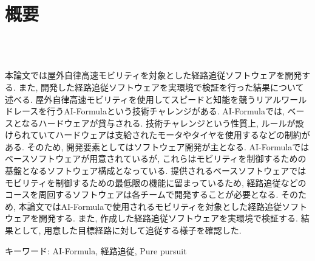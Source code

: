 \chapter*{概要}
\thispagestyle{empty}
%
\begin{center}
  \centering
  \scalebox{1.5}{屋外自律高速モビリティを対象とした}\\
  \scalebox{1.5}{経路追従ソフトウェアの開発}\\
\end{center}
\vspace{1.0zh}
%

%
本論文では屋外自律高速モビリティを対象とした経路追従ソフトウェアを開発する.
また, 開発した経路追従ソフトウェアを実環境で検証を行った結果について述べる.
屋外自律高速モビリティを使用してスピードと知能を競うリアルワールドレースを行うAI-Formulaという技術チャレンジがある.
%
AI-Formulaでは, ベースとなるハードウェアが貸与される.
技術チャレンジという性質上, ルールが設けられていてハードウェアは支給されたモータやタイヤを使用するなどの制約がある.
そのため, 開発要素としてはソフトウェア開発が主となる.
%
AI-Formulaではベースソフトウェアが用意されているが, これらはモビリティを制御するための基盤となるソフトウェア構成となっている.
提供されるベースソフトウェアではモビリティを制御するための最低限の機能に留まっているため, 経路追従などのコースを周回するソフトウェアは各チームで開発することが必要となる.
そのため, 本論文ではAI-Formulaで使用されるモビリティを対象とした経路追従ソフトウェアを開発する.
また, 作成した経路追従ソフトウェアを実環境で検証する.
結果として, 用意した目標経路に対して追従する様子を確認した.

%
%
%
%
%
%
%
%
%
%
%
%
%

\vspace{2.0zh}

キーワード: AI-Formula, 経路追従, Pure pursuit
%

\newpage
